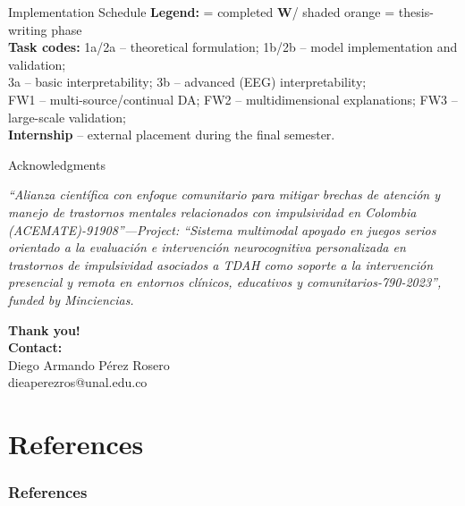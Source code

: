 \documentclass[aspectratio=169]{beamer}
\newcommand{\cmark}{\checkmark}
\newcommand{\wmark}{\textbf{W}} %
\begin{document}
\begin{frame}{Implementation Schedule}
\vspace{0.6em}
\tiny
\textbf{Legend:} \cmark = completed \hspace{1em} \wmark / shaded orange = thesis-writing phase\\[0.4ex]
\textbf{Task codes:}
1a/2a – theoretical formulation; 1b/2b – model implementation and validation;\\
3a – basic interpretability; 3b – advanced (EEG) interpretability;\\
FW1 – multi-source/continual DA; FW2 – multidimensional explanations; FW3 – large-scale validation;\\
\textbf{Internship} – external placement during the final semester.
\end{frame}

\begin{frame}{Acknowledgments}


   \textit{“Alianza científica con enfoque comunitario para mitigar brechas de atención y manejo de trastornos mentales relacionados con impulsividad en Colombia (ACEMATE)-91908”—Project: “Sistema multimodal apoyado en juegos serios orientado a la evaluación e intervención neurocognitiva personalizada en trastornos de impulsividad asociados a TDAH como soporte a la intervención presencial y remota en entornos clínicos, educativos y comunitarios-790-2023”, funded by Minciencias.}




\begin{center}
	{\Huge{\textbf{\textcolor[rgb]{0.00,0.00,1.00}{Thank you!}}}}\\
	\vspace{0.2cm}
    \textbf{Contact:}\\
    \vspace{0.2cm}
	 Diego Armando Pérez Rosero\\ {\scriptsize{dieaperezros@unal.edu.co}}\\
\end{center}    
    
\end{frame}


\section{References}

\begin{frame}[allowframebreaks]%
\frametitle{References}
{\tiny 


}
\end{frame}
\end{document}
